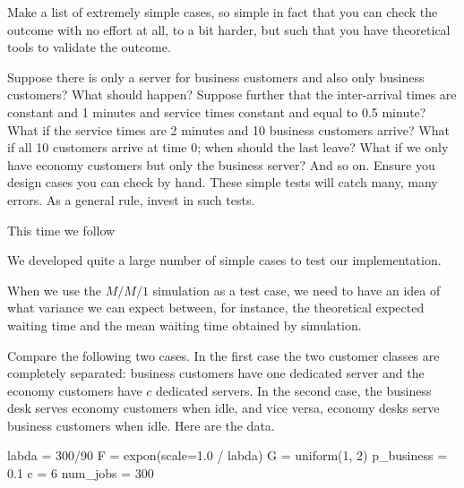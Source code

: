 \begin{exercise}
  Make a list of extremely simple cases, so simple in fact that you can check the outcome with no effort at all, to a bit harder, but such that you have theoretical tools to validate the outcome.
  \begin{hint}
Suppose there is only a server for business customers and also only business customers? What should happen? Suppose further that the inter-arrival times are constant and  1 minutes and service times constant and equal to 0.5 minute? What if the service times are 2 minutes and 10 business customers arrive? What if all 10 customers arrive at time 0; when should the last leave? What if we only have economy customers but only the business server? And so on. Ensure you design cases you can check by hand. These simple tests will catch many, many errors. As a general rule, invest in such tests. 
  \end{hint}
  
\end{exercise}



This time we follow

We developed quite a large number of simple cases to test our implementation. 



When we use the $M/M/1$ simulation as a test case, we need to have an idea of what  variance we can expect between, for instance, the theoretical expected waiting time and the mean waiting time obtained by simulation.


\begin{exercise}
Compare the following two cases. In the first case the two customer classes are completely separated:  business customers have one dedicated server and the economy customers have $c$ dedicated servers.  In the second case, the business desk serves economy customers when idle, and vice versa, economy desks serve business customers when idle.  Here are the data. 
  \begin{pyverbatim}
labda = 300/90
F = expon(scale=1.0 / labda)
G = uniform(1, 2)
p_business = 0.1
c = 6
num_jobs = 300
  \end{pyverbatim}
  


\end{exercise}




